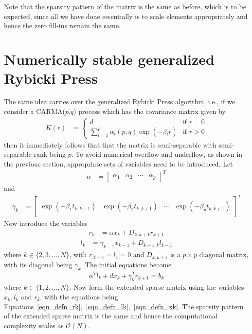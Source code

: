 \documentclass[final,leqno]{siamltex}
\begin{document}
Note that the sparsity pattern of the matrix is the same as before, which is to be expected, since all we have done essentially is to scale elements appropriately and hence the zero fill-ins remain the same.

\section{Numerically stable generalized Rybicki Press}
The same idea carries over the generalized Rybicki Press algorithm, i.e., if we consider a CARMA($p$,$q$) process which has the covariance matrix given by
\begin{align}
K(r) & =
\begin{cases}
d & \text{if } r=0\\
\displaystyle \sum_{l=1}^p \alpha_l(p,q) \exp(-\beta_l r) & \text{if }r >0
\end{cases}
\end{align}
then it immediately follows that that the matrix is semi-separable with semi-separable rank being $p$. To avoid numerical overflow and underflow, as shown in the previous section, appropriate sets of variables need to be introduced. Let
\begin{align}
\alpha & = \begin{bmatrix} \alpha_1 & \alpha_2 & \cdots & \alpha_p\end{bmatrix}^T
\end{align}
and
\begin{align}
\gamma_k & = \begin{bmatrix}\exp(-\beta_1 t_{k,k+1})& \exp(-\beta_2 t_{k,k+1}) & \cdots& \exp(-\beta_p t_{k,k+1}) \end{bmatrix}^T
\end{align}
Now introduce the variables
\begin{align}
r_k & = \alpha x_k + D_{k,k+1} r_{k+1}
\label{eqn_defn_rk}
\end{align}
\begin{align}
l_{k} & = \gamma_{k-1} x_{k-1} + D_{k-1,k}l_{k-1}
\label{eqn_defn_lk}
\end{align}
where $k \in \{2,3,\ldots,N\}$, with $r_{N+1} = l_1 = 0$ and $D_{k,k+1}$ is a $p \times p$ diagonal matrix, with its diagonal being $\gamma_k$. The initial equations become
\begin{align}
\alpha^T l_k + dx_k + \gamma_k^T r_{k+1} = b_k
\label{eqn_defn_xk}
\end{align}
where $k \in \{1,2,\ldots,N\}$. Now form the extended sparse matrix using the variables $x_k,l_k$ and $r_k$, with the equations being Equations~\eqref{eqn_defn_rk},~\eqref{eqn_defn_lk},~\eqref{eqn_defn_xk}. The sparsity pattern of the extended sparse matrix is the same and hence the computational complexity scales as $\mathcal{O}(N)$.
\end{document}
